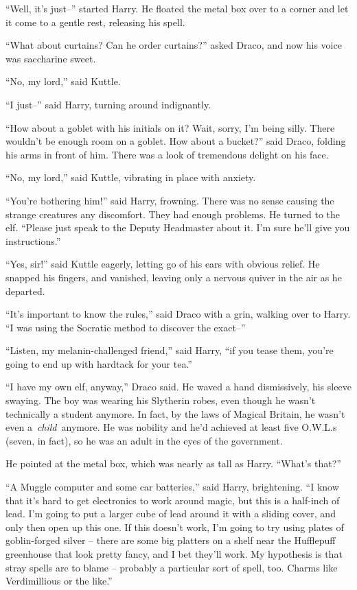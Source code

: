 ``Well, it's just--'' started Harry. He floated the metal box over to a
corner and let it come to a gentle rest, releasing his spell.

``What about curtains? Can he order curtains?'' asked Draco, and now his
voice was saccharine sweet.

``No, my lord,'' said Kuttle.

``I just--'' said Harry, turning around indignantly.

``How about a goblet with his initials on it? Wait, sorry, I'm being
silly. There wouldn't be enough room on a goblet. How about a bucket?''
said Draco, folding his arms in front of him. There was a look of
tremendous delight on his face.

``No, my lord,'' said Kuttle, vibrating in place with anxiety.

``You're bothering him!'' said Harry, frowning. There was no sense
causing the strange creatures any discomfort. They had enough problems.
He turned to the elf. ``Please just speak to the Deputy Headmaster about
it. I'm sure he'll give you instructions.''

``Yes, sir!'' said Kuttle eagerly, letting go of his ears with obvious
relief. He snapped his fingers, and vanished, leaving only a nervous
quiver in the air as he departed.

``It's important to know the rules,'' said Draco with a grin, walking
over to Harry. ``I was using the Socratic method to discover the
exact--''

``Listen, my melanin-challenged friend,'' said Harry, ``if you tease
them, you're going to end up with hardtack for your tea.''

``I have my own elf, anyway,'' Draco said. He waved a hand dismissively,
his sleeve swaying. The boy was wearing his Slytherin robes, even though
he wasn't technically a student anymore. In fact, by the laws of Magical
Britain, he wasn't even a~\emph{child}~anymore. He was nobility and he'd
achieved at least five O.W.L.s (seven, in fact), so he was an adult in
the eyes of the government.

He pointed at the metal box, which was nearly as tall as Harry. ``What's
that?''

``A Muggle computer and some car batteries,'' said Harry, brightening.
``I know that it's hard to get electronics to work around magic, but
this is a half-inch of lead. I'm going to put a larger cube of lead
around it with a sliding cover, and only then open up this one. If this
doesn't work, I'm going to try using plates of goblin-forged silver --
there are some big platters on a shelf near the Hufflepuff greenhouse
that look pretty fancy, and I bet they'll work. My hypothesis is that
stray spells are to blame -- probably a particular sort of spell, too.
Charms like Verdimillious or the like.''

